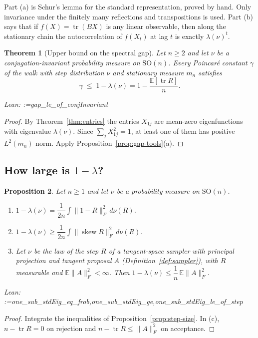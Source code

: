 \documentclass[11pt]{amsart}
\makeatletter
\newtheorem{theorem}{Theorem}[section]
\newtheorem{proposition}[theorem]{Proposition}
\theoremstyle{definition}
\theoremstyle{remark}
\newcommand{\@leanlist}[1]{\def\@leansep{}\@for\@leanname:=#1\do{\@leansep
  \texttt{\expandafter\detokenize\expandafter{\@leanname}}\def\@leansep{, }}}
\newcommand{\lean}[1]{\par\smallskip\noindent
  {\footnotesize\normalfont\raggedright\textsf{Lean:} \@leanlist{#1}\par}}
\newcommand{\E}{\mathbb{E}}
\newcommand{\SO}{\mathrm{SO}}
\newcommand{\tr}{\operatorname{tr}}
\newcommand{\skw}{\operatorname{skew}}
\newcommand{\fro}[1]{\lVert #1\rVert_{F}}
\makeatother
\begin{document}
Part (a) is Schur's lemma for the standard representation, proved by hand.  Only invariance
under the finitely many reflections and transpositions is used.  Part (b) says that if
$f(X)=\tr(BX)$ is any linear observable, then along the stationary chain the autocorrelation of
$f(X_t)$ at lag $t$ is exactly $\lambda(\nu)^t$.

\begin{theorem}[Upper bound on the spectral gap]\label{thm:gap-upper}
Let $n\ge2$ and let $\nu$ be a conjugation-invariant probability measure on $\SO(n)$.  Every
Poincar\'e constant $\gamma$ of the walk with step distribution $\nu$ and stationary measure
$m_n$ satisfies
\[
  \gamma\;\le\;1-\lambda(\nu)=1-\frac{\E[\tr R]}{n}.
\]
\lean{gap_le_of_conjInvariant}
\end{theorem}

\begin{proof}
By Theorem~\ref{thm:entries} the entries $X_{1j}$ are mean-zero eigenfunctions with eigenvalue
$\lambda(\nu)$.  Since $\sum_jX_{1j}^2=1$, at least one of them has positive $L^2(m_n)$ norm.
Apply Proposition~\ref{prop:gap-tools}(a).
\end{proof}

\subsection{How large is \texorpdfstring{$1-\lambda$}{1 - lambda}?}

\begin{proposition}\label{prop:one-minus-lambda}
Let $n\ge1$ and let $\nu$ be a probability measure on $\SO(n)$.
\begin{enumerate}
\item[(a)] $1-\lambda(\nu)=\dfrac{1}{2n}\displaystyle\int\fro{1-R}^2\,d\nu(R)$.
\item[(b)] $1-\lambda(\nu)\ge\dfrac1{2n}\displaystyle\int\fro{\skw R}^2\,d\nu(R)$.
\item[(c)] Let $\nu$ be the law of the step $R$ of a tangent-space sampler with principal
projection and tangent proposal $A$ (Definition~\ref{def:sampler}), with $R$ measurable and
$\E\fro{A}^2<\infty$.  Then $1-\lambda(\nu)\le\dfrac1n\,\E\fro{A}^2$.
\end{enumerate}
\lean{one_sub_stdEig_eq_frob,one_sub_stdEig_ge,one_sub_stdEig_le_of_step}
\end{proposition}

\begin{proof}
Integrate the inequalities of Proposition~\ref{prop:step-size}.  In (c), $n-\tr R=0$ on
rejection and $n-\tr R\le\fro{A}^2$ on acceptance.
\end{proof}
\end{document}
